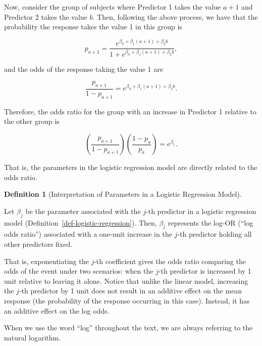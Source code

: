 \documentclass[
  letterpaper,
  DIV=11,
  numbers=noendperiod]{scrreprt}
\theoremstyle{definition}
\newtheorem{definition}{Definition}[chapter]
\theoremstyle{definition}
\theoremstyle{remark}
\begin{document}
Now, consider the group of subjects where Predictor 1 takes the value
\(a + 1\) and Predictor 2 takes the value \(b\). Then, following the
above process, we have that the probability the response takes the value
1 in this group is

\[p_{a+1} = \frac{e^{\beta_0 + \beta_1 (a + 1) + \beta_2 b}}{1 + e^{\beta_0 + \beta_1 (a + 1)+ \beta_2 b}},\]

and the odds of the response taking the value 1 are

\[\frac{p_{a+1}}{1 - p_{a+1}} = e^{\beta_0 + \beta_1 (a + 1) + \beta_2 b}.\]

Therefore, the odds ratio for the group with an increase in Predictor 1
relative to the other group is

\[\left(\frac{p_{a+1}}{1 - p_{a+1}}\right) \left(\frac{1 - p_a}{p_a}\right) = e^{\beta_1}.\]

That is, the parameters in the logistic regression model are directly
related to the odds ratio.

\begin{definition}[Interpretation of Parameters in a Logistic Regression
Model]\protect\hypertarget{def-logistic-interpretation}{}\label{def-logistic-interpretation}

Let \(\beta_j\) be the parameter associated with the \(j\)-th predictor
in a logistic regression model
(Definition~\ref{def-logistic-regression}). Then, \(\beta_j\) represents
the log-OR (``log odds ratio'') associated with a one-unit increase in
the \(j\)-th predictor holding all other predictors fixed.

\end{definition}

That is, exponentiating the \(j\)-th coefficient gives the odds ratio
comparing the odds of the event under two scenarios: when the \(j\)-th
predictor is increased by 1 unit relative to leaving it alone. Notice
that unlike the linear model, increasing the \(j\)-th predictor by 1
unit does not result in an additive effect on the mean response (the
probability of the response occurring in this case). Instead, it has an
additive effect on the log odds.

\begin{tcolorbox}[enhanced jigsaw, left=2mm, toprule=.15mm, arc=.35mm, breakable, opacitybacktitle=0.6, opacityback=0, rightrule=.15mm, colbacktitle=quarto-callout-note-color!10!white, coltitle=black, leftrule=.75mm, toptitle=1mm, colframe=quarto-callout-note-color-frame, titlerule=0mm, title=\textcolor{quarto-callout-note-color}{\faInfo}\hspace{0.5em}{Note}, bottomrule=.15mm, colback=white, bottomtitle=1mm]

When we use the word ``log'' throughout the text, we are always
referring to the natural logarithm.

\end{tcolorbox}
\end{document}
